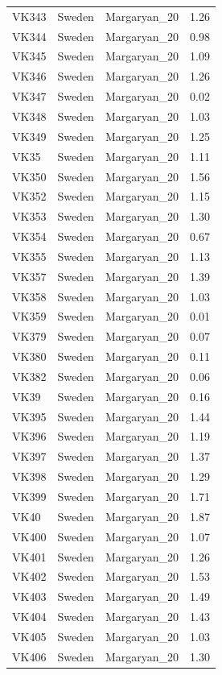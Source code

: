 \begin{longtable}[t]{lllr}
VK343 & Sweden & Margaryan\_20 & 1.26\\
VK344 & Sweden & Margaryan\_20 & 0.98\\
VK345 & Sweden & Margaryan\_20 & 1.09\\
VK346 & Sweden & Margaryan\_20 & 1.26\\
VK347 & Sweden & Margaryan\_20 & 0.02\\
VK348 & Sweden & Margaryan\_20 & 1.03\\
VK349 & Sweden & Margaryan\_20 & 1.25\\
VK35 & Sweden & Margaryan\_20 & 1.11\\
VK350 & Sweden & Margaryan\_20 & 1.56\\
VK352 & Sweden & Margaryan\_20 & 1.15\\
VK353 & Sweden & Margaryan\_20 & 1.30\\
VK354 & Sweden & Margaryan\_20 & 0.67\\
VK355 & Sweden & Margaryan\_20 & 1.13\\
VK357 & Sweden & Margaryan\_20 & 1.39\\
VK358 & Sweden & Margaryan\_20 & 1.03\\
VK359 & Sweden & Margaryan\_20 & 0.01\\
VK379 & Sweden & Margaryan\_20 & 0.07\\
VK380 & Sweden & Margaryan\_20 & 0.11\\
VK382 & Sweden & Margaryan\_20 & 0.06\\
VK39 & Sweden & Margaryan\_20 & 0.16\\
VK395 & Sweden & Margaryan\_20 & 1.44\\
VK396 & Sweden & Margaryan\_20 & 1.19\\
VK397 & Sweden & Margaryan\_20 & 1.37\\
VK398 & Sweden & Margaryan\_20 & 1.29\\
VK399 & Sweden & Margaryan\_20 & 1.71\\
VK40 & Sweden & Margaryan\_20 & 1.87\\
VK400 & Sweden & Margaryan\_20 & 1.07\\
VK401 & Sweden & Margaryan\_20 & 1.26\\
VK402 & Sweden & Margaryan\_20 & 1.53\\
VK403 & Sweden & Margaryan\_20 & 1.49\\
VK404 & Sweden & Margaryan\_20 & 1.43\\
VK405 & Sweden & Margaryan\_20 & 1.03\\
VK406 & Sweden & Margaryan\_20 & 1.30\\

\end{longtable}
